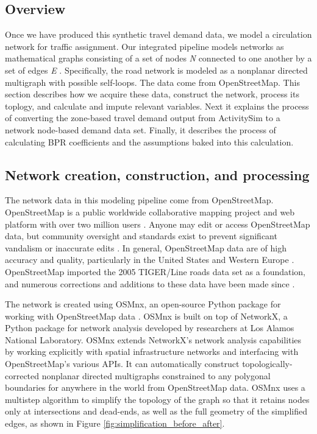 \subsection{Overview}

Once we have produced this synthetic travel demand data, we model a circulation network for traffic assignment. Our integrated pipeline models networks as mathematical graphs consisting of a set of nodes \textit{N} connected to one another by a set of edges \textit{E} \cite{newman_networks:_2010,gastner_spatial_2006}. Specifically, the road network is modeled as a nonplanar directed multigraph with possible self-loops. The data come from OpenStreetMap. This section describes how we acquire these data, construct the network, process its toplogy, and calculate and impute relevant variables. Next it explains the process of converting the zone-based travel demand output from ActivitySim to a network node-based demand data set. Finally, it describes the process of calculating BPR coefficients and the assumptions baked into this calculation.

\subsection{Network creation, construction, and processing}

The network data in this modeling pipeline come from OpenStreetMap. OpenStreetMap is a public worldwide collaborative mapping project and web platform with over two million users \cite{}. Anyone may edit or access OpenStreetMap data, but community oversight and standards exist to prevent significant vandalism or inaccurate edits \cite{jokar_arsanjani_openstreetmap_2015}. In general, OpenStreetMap data are of high accuracy and quality, particularly in the United States and Western Europe \cite{corcoran_analysing_2013,over_generating_2010,haklay_how_2010,maron_how_2015}. OpenStreetMap imported the 2005 TIGER/Line roads data set as a foundation, and numerous corrections and additions to these data have been made since \cite{willis_openstreetmap_2008}.

The network is created using OSMnx, an open-source Python package for working with OpenStreetMap data \cite{boeing_osmnx:_2017}. OSMnx is built on top of NetworkX, a Python package for network analysis developed by researchers at Los Alamos National Laboratory. OSMnx extends NetworkX's network analysis capabilities by working explicitly with spatial infrastructure networks and interfacing with OpenStreetMap's various APIs. It can automatically construct topologically-corrected nonplanar directed multigraphs constrained to any polygonal boundaries for anywhere in the world from OpenStreetMap data. OSMnx uses a multistep algorithm to simplify the topology of the graph so that it retains nodes only at intersections and dead-ends, as well as the full geometry of the simplified edges, as shown in Figure \ref{fig:simplification_before_after}.

